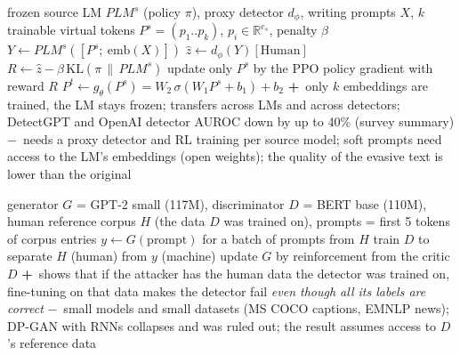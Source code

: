 \documentclass[10pt,a4paper,twocolumn]{article}
\newcommand{\pro}[1]{\Statex\textcolor{proc}{\textbf{+}\ #1}}
\newcommand{\con}[1]{\Statex\textcolor{conc}{\textbf{$-$}\ #1}}
\begin{document}
\begin{algorithm}[H]\small
\caption{EScaPe: evasive soft prompts (Kumarage et al.\ 2023)}
\begin{algorithmic}[1]
\Require frozen source LM $PLM^s$ (policy $\pi$), proxy detector $d_\phi$, writing prompts $X$, $k$ trainable virtual tokens $P^s=(p_1..p_k)$, $p_i\in\mathbb R^{e_s}$, penalty $\beta$
  \State $Y\gets PLM^s([P^s;\ \mathrm{emb}(X)])$ 
  \State $\hat z\gets d_\phi(Y)[\text{Human}]$ 
  \State $R\gets\hat z-\beta\,\mathrm{KL}(\pi\,\|\,PLM^s)$ 
  \State update only $P^s$ by the PPO policy gradient with reward $R$
 \EndFor
\EndProcedure
{}
 \State $P^t\gets g_\theta(P^s)=W_2\,\sigma(W_1P^s+b_1)+b_2$ 
\EndProcedure
\pro{only $k$ embeddings are trained, the LM stays frozen; transfers across LMs and across detectors; DetectGPT and OpenAI detector AUROC down by up to 40\% (survey summary)}
\con{needs a proxy detector and RL training per source model; soft prompts need access to the LM's embeddings (open weights); the quality of the evasive text is lower than the original}
\end{algorithmic}
\end{algorithm}

\begin{algorithm}[H]\small
\caption{Fine-tuning against a detector, ``hide and seek'' (Da Silva Gameiro Henrique et al.\ 2023)}
\begin{algorithmic}[1]
\Require generator $G$ = GPT-2 small (117M), discriminator $D$ = BERT base (110M), human reference corpus $H$ (the data $D$ was trained on), prompts = first 5 tokens of corpus entries
 \Repeat
  \State $y\gets G(\text{prompt})$ for a batch of prompts from $H$
  \State train $D$ to separate $H$ (human) from $y$ (machine)
  \State update $G$ by reinforcement from the critic $D$ 
\EndProcedure
\pro{shows that if the attacker has the human data the detector was trained on, fine-tuning on that data makes the detector fail \emph{even though all its labels are correct}}
\con{small models and small datasets (MS COCO captions, EMNLP news); DP-GAN with RNNs collapses and was ruled out; the result assumes access to $D$'s reference data}
\end{algorithmic}
\end{algorithm}
\end{document}
